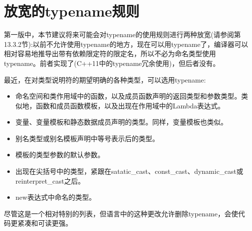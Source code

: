 \section{放宽的typename规则}

第一版中，本节建议将来可能会对typename的使用规则进行两种放宽(请参阅第13.3.2节):以前不允许使用typename的地方，现在可以用typename了，编译器可以相对容易地推导出带有依赖限定符的限定名，所以不必为命名类型使用typename。前者实现了(C++11中的typename冗余使用)，但后者没有。

最近，在对类型说明符的期望明确的各种类型，可以选用typename:

\begin{itemize}
\item 
命名空间和类作用域中的函数，以及成员函数声明的返回类型和参数类型。类似地，函数和成员函数模板，以及出现在作用域中的Lambda表达式。

\item 
变量、变量模板和静态数据成员声明的类型。同样，变量模板也类似。

\item 
别名类型或别名模板声明中等号表示后的类型。

\item 
模板的类型参数的默认参数。

\item 
出现在尖括号中的类型，紧跟在satatic\_cast、const\_cast、dynamic\_cast或reinterpret\_cast之后。

\item 
new表达式中命名的类型。
\end{itemize}

尽管这是一个相对特别的列表，但语言中的这种更改允许删除typename，会使代码更紧凑和可读更强。

